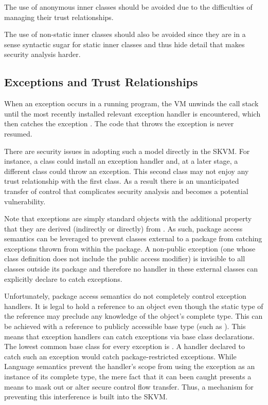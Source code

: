 \documentclass{llncs}
\begin{document}
The use of anonymous inner classes should be avoided due to the
difficulties of managing their trust relationships.

The use of non-static inner classes should also be avoided since
they are in a sense syntactic sugar for static inner classes and
thus hide detail that makes security analysis harder.

\subsection{Exceptions and Trust Relationships}

When an exception occurs in a running program, the VM unwinds the
call stack until the most recently installed relevant exception
handler is encountered, which then catches the exception \cite[section 11.3]{jls} \cite[sections 2.16.2 and 3.10]{jvms}. The code that throws
the exception is never resumed.

There are security issues in adopting such a model directly in the
SKVM. For instance, a class could install an exception handler and,
at a later stage, a different class could throw an exception. This
second class may not enjoy any trust relationship with the first
class. As a result there is an unanticipated transfer of control
that complicates security analysis and becomes a potential
vulnerability.

Note that exceptions are simply standard objects with the additional
property that they are derived (indirectly or directly) from
. As such, package access semantics can be
leveraged to prevent classes external to a package from catching
exceptions thrown from within the package. A non-public exception
(one whose class definition does not include the public access
modifier) is invisible to all classes outside its package and
therefore no handler in these external classes can explicitly declare
to catch exceptions.

Unfortunately, package access semantics do not completely control
exception handlers. It is legal to hold a reference to an object
even though the static type of the reference may preclude any knowledge
of the object's complete type. This can be achieved with a reference
to publicly accessible base type (such as ). This
means that exception handlers can catch exceptions via base class
declarations. The lowest common base class for every exception is
. A handler declared to catch such an exception
would catch package-restricted exceptions. While Language semantics
prevent the handler's scope from using the exception as an instance
of its complete type, the mere fact that it can been caught presents
a means to mask out or alter secure control flow transfer. Thus, a
mechanism for preventing this interference is built into the SKVM.
\end{document}
